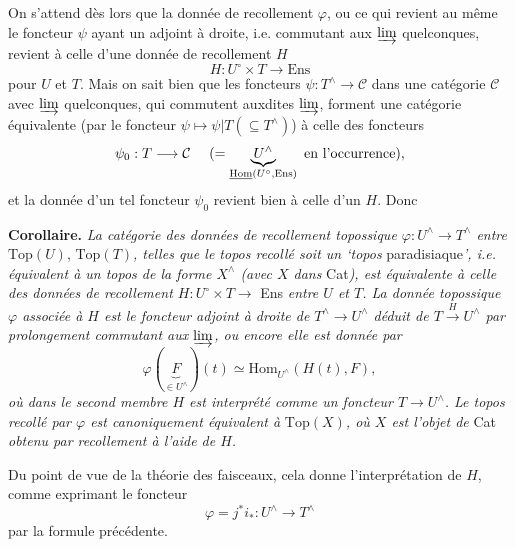 On s'attend dès lors que la donnée de recollement $\varphi$, ou ce qui revient au même le foncteur $\psi$ ayant un adjoint à droite, i.e. commutant aux $\varinjlim$ quelconques, revient à celle d'une donnée de recollement $H$
\[
H : U^\circ \times T \longrightarrow \mathrm{Ens}
\]
pour $U$ et $T$. Mais on sait bien que les foncteurs $\psi : T^\wedge \longrightarrow \mathcal{C}$ dans une catégorie $\mathcal{C}$ avec $\varinjlim$ quelconques, qui commutent auxdites $\varinjlim$, forment une catégorie équivalente (par le foncteur $\psi \longmapsto \psi|T(\subseteq T^\wedge)$) à celle des foncteurs
\[
\psi_0 : T \longrightarrow \mathcal{C} \quad\ (= \underbrace{U^\wedge}_{\underline{\mathrm{Hom}}(U^\circ,\mathrm{Ens})} \text{ en l'occurrence}),
\]
et la donnée d'un tel foncteur $\psi_0$ revient bien à celle d'un $H$. Donc

\textbf{Corollaire.} \textit{La catégorie des données de recollement topossique $\varphi : U^\wedge \longrightarrow T^\wedge$ entre} $\mathrm{Top}(U)$, $\mathrm{Top}(T)$\textit{, telles que le topos recollé soit un `topos} paradisiaque\textit{', i.e. équivalent à un topos de la forme $X^\wedge$ (avec $X$ dans} Cat\textit{), est équivalente à celle des données de recollement $H : U^\circ \times T \longrightarrow$} Ens \textit{entre $U$ et $T$. La donnée topossique $\varphi$ associée à $H$ est le foncteur adjoint à droite de $T^\wedge \longrightarrow U^\wedge$ déduit de $T \xrightarrow{H} U^\wedge$ par prolongement commutant aux $\varinjlim$, ou encore elle est donnée par}
\[
\varphi(\underbrace{F}_{\in U^\wedge})(t) \simeq \mathrm{Hom}_{U^\wedge}(H(t),F),
\]
\textit{où dans le second membre $H$ est interprété comme un foncteur $T \longrightarrow U^\wedge$. Le topos recollé par $\varphi$ est canoniquement équivalent à} $\mathrm{Top}(X)$\textit{, où $X$ est l'objet de} Cat \textit{obtenu par recollement à l'aide de $H$.}

Du point de vue de la théorie des faisceaux, cela donne l'interprétation de $H$, comme exprimant le foncteur
\[
\varphi = j^*i_* : U^\wedge \longrightarrow T^\wedge
\]
par la formule précédente.



